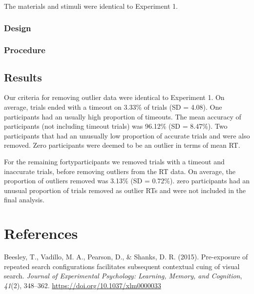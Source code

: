 \documentclass[
  man]{apa6}
\newlength{\cslhangindent}
\newlength{\cslentryspacingunit} %
\newenvironment{CSLReferences}[2] %
 {%
  \setlength{\parindent}{0pt}
  \ifodd #1
  \let\oldpar\par
  \def\par{\hangindent=\cslhangindent\oldpar}
  \fi
  \setlength{\parskip}{#2\cslentryspacingunit}
 }%
 {}
\begin{document}
The materials and stimuli were identical to Experiment 1.

\hypertarget{design-2}{%
\subsubsection{Design}\label{design-2}}

\hypertarget{procedure-2}{%
\subsubsection{Procedure}\label{procedure-2}}

\hypertarget{results-2}{%
\subsection{Results}\label{results-2}}

Our criteria for removing outlier data were identical to Experiment 1. On average, trials ended with a timeout on 3.33\% of trials (SD = 4.08). One participants had an usually high proportion of timeouts. The mean accuracy of participants (not including timeout trials) was 96.12\% (SD = 8.47\%). Two participants that had an unusually low proportion of accurate trials and were also removed. Zero participants were deemed to be an outlier in terms of mean RT.

For the remaining fortyparticipants we removed trials with a timeout and inaccurate trials, before removing outliers from the RT data. On average, the proportion of outliers removed was 3.13\% (SD = 0.72\%). zero participants had an unusual proportion of trials removed as outlier RTs and were not included in the final analysis.

\newpage

\hypertarget{references}{%
\section*{References}\label{references}}

\hypertarget{refs}{}
\begin{CSLReferences}{1}{0}
\leavevmode{}%
Beesley, T., Vadillo, M. A., Pearson, D., \& Shanks, D. R. (2015). Pre-exposure of repeated search configurations facilitates subsequent contextual cuing of visual search. \emph{Journal of Experimental Psychology: Learning, Memory, and Cognition}, \emph{41}(2), 348--362. \url{https://doi.org/10.1037/xlm0000033}

\end{CSLReferences}
\end{document}
